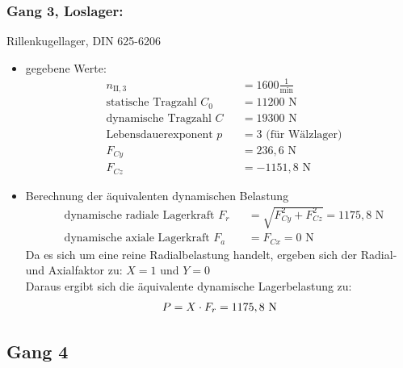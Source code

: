 \subsubsection{Gang 3, Loslager:} Rillenkugellager, DIN 625-6206\\
\begin{itemize}
	\item gegebene Werte:
	\begin{align*}
	&n_{{\mathord{\mathrm{II}},3}} &&=  1600 \frac{1}{\text{min}} \\
	&\text{statische Tragzahl } C_{0} &&= 11200 \text{ N}\\
	&\text{dynamische Tragzahl } C &&= 19300 \text{ N} \\
	&\text{Lebensdauerexponent } p &&= 3 \text{ (für Wälzlager)} \\
	&F_{Cy} && = 236,6 \text{ N}\\
	&F_{Cz} && = -1151,8 \text{ N}
	\end{align*} 
	\item Berechnung der äquivalenten dynamischen Belastung
	\begin{align*}
	&\text{dynamische radiale Lagerkraft } F_r&& = \sqrt{F_{Cy}^2 + F_{Cz}^2 } =1175,8 \text{ N} \\
	&\text{dynamische axiale Lagerkraft } F_a&& = F_{Cx} = 0\text{ N}
	\end{align*} 
	Da es sich um eine reine Radialbelastung handelt, ergeben sich der Radial- und Axialfaktor zu: $X= 1$ und $Y=0$\\
	Daraus ergibt sich die äquivalente dynamische Lagerbelastung zu:  
	\[
	P= X \cdot F_r =1175,8 \text{ N}
	\]
\end{itemize}
\newpage

\subsection{Gang 4}
